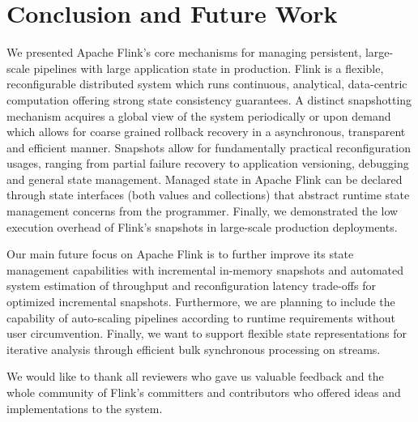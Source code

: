 
\section{Conclusion and Future Work}
\label{sec:conclusion}

We presented Apache Flink's core mechanisms for managing persistent, large-scale pipelines with large application state in production. Flink is a flexible, reconfigurable distributed system which runs continuous, analytical, data-centric computation offering strong state consistency guarantees. A distinct snapshotting mechanism acquires a global view of the system periodically or upon demand which allows for coarse grained rollback recovery in a asynchronous, transparent and efficient manner. Snapshots allow for fundamentally practical reconfiguration usages, ranging from partial failure recovery to application versioning, debugging and general state management. Managed state in Apache Flink can be declared through state interfaces (both values and collections) that abstract runtime state management concerns from the programmer. Finally, we demonstrated the low execution overhead of Flink's snapshots in large-scale production deployments.

\vspace{-1mm}
 Our main future focus on Apache Flink is to further improve its state management capabilities with incremental in-memory snapshots and automated system estimation of throughput and reconfiguration latency trade-offs for optimized incremental snapshots. Furthermore, we are planning to include the capability of auto-scaling pipelines according to runtime requirements without user circumvention. Finally, we want to support flexible state representations for iterative analysis through efficient bulk synchronous processing on streams.

\vspace{-1mm}
 We would like to thank all reviewers who gave us valuable feedback and the whole community of Flink's committers and contributors who offered ideas and implementations to the system. 
